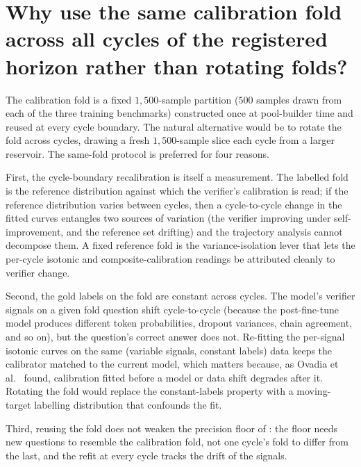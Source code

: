 
\section[Same calibration fold across cycles]{Why use the same calibration fold across all cycles of the registered horizon rather than rotating folds?}
\label{app:qa-same-fold}

The calibration fold is a fixed $1{,}500$-sample partition ($500$ samples drawn from each of the three training benchmarks) constructed once at pool-builder time and reused at every cycle boundary. The natural alternative would be to rotate the fold across cycles, drawing a fresh $1{,}500$-sample slice each cycle from a larger reservoir. The same-fold protocol is preferred for four reasons.

First, the cycle-boundary recalibration is itself a measurement. The labelled fold is the reference distribution against which the verifier's calibration is read; if the reference distribution varies between cycles, then a cycle-to-cycle change in the fitted curves entangles two sources of variation (the verifier improving under self-improvement, and the reference set drifting) and the trajectory analysis cannot decompose them. A fixed reference fold is the variance-isolation lever that lets the per-cycle isotonic and composite-calibration readings be attributed cleanly to verifier change.

Second, the gold labels on the fold are constant across cycles. The model's verifier signals on a given fold question shift cycle-to-cycle (because the post-fine-tune model produces different token probabilities, dropout variances, chain agreement, and so on), but the question's correct answer does not. Re-fitting the per-signal isotonic curves on the same (variable signals, constant labels) data keeps the calibrator matched to the current model, which matters because, as Ovadia et al.~\cite{ovadia2019trust} found, calibration fitted before a model or data shift degrades after it. Rotating the fold would replace the constant-labels property with a moving-target labelling distribution that confounds the fit.

Third, reusing the fold does not weaken the precision floor of : the floor needs new questions to resemble the calibration fold, not one cycle's fold to differ from the last, and the refit at every cycle tracks the drift of the signals.

